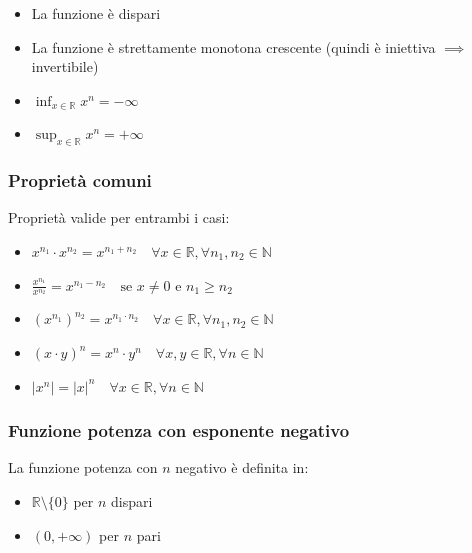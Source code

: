 \documentclass[oneside,10pt]{book} %
\begin{document}
\begin{itemize}
\item La funzione è dispari
\item La funzione è strettamente monotona crescente (quindi è iniettiva $\implies$ invertibile)
\item $\inf_{x \in \mathbb{R}} x^n = -\infty$
\item $\sup_{x \in \mathbb{R}} x^n = +\infty$
\end{itemize}

\subsubsection{Proprietà comuni}
Proprietà valide per entrambi i casi:
\begin{itemize}
\item $x^{n_1} \cdot x^{n_2} = x^{n_1+n_2} \quad \forall x \in \mathbb{R}, \forall n_1, n_2 \in \mathbb{N}$
\item $\frac{x^{n_1}}{x^{n_2}} = x^{n_1-n_2} \quad \text{se } x \neq 0 \text{ e } n_1 \geq n_2$
\item $(x^{n_1})^{n_2} = x^{n_1 \cdot n_2} \quad \forall x \in \mathbb{R}, \forall n_1, n_2 \in \mathbb{N}$
\item $(x \cdot y)^n = x^n \cdot y^n \quad \forall x, y \in \mathbb{R}, \forall n \in \mathbb{N}$
\item $|x^n| = |x|^n \quad \forall x \in \mathbb{R}, \forall n \in \mathbb{N}$
\end{itemize}



\subsubsection{Funzione potenza con esponente negativo}

La funzione potenza con $n$ negativo è definita in:
\begin{itemize}
\item $\mathbb{R} \setminus \{0\}$ per $n$ dispari
\item $(0, +\infty)$ per $n$ pari
\end{itemize}
\end{document}
